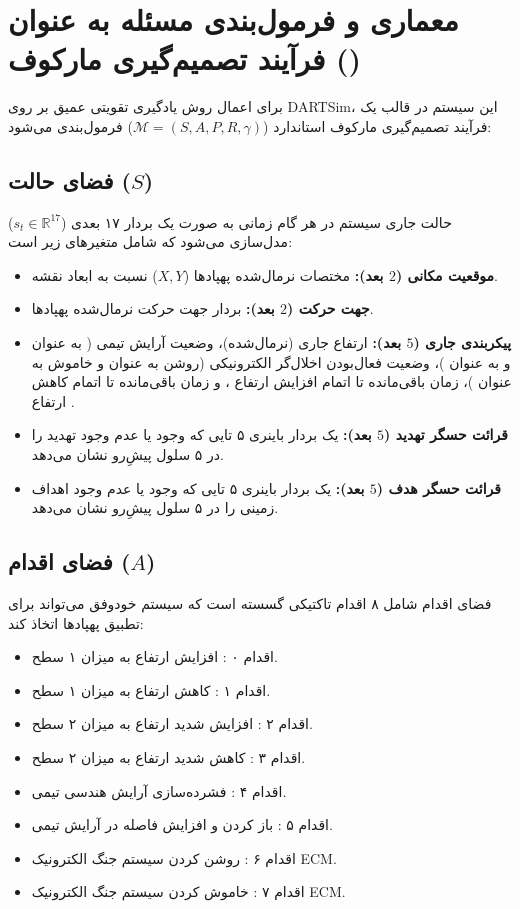 \documentclass[oneside,openany,a4paper,12pt]{article}
\begin{document}
\section{معماری و فرمول‌بندی مسئله به عنوان فرآیند تصمیم‌گیری مارکوف ()}
برای اعمال روش یادگیری تقویتی عمیق بر روی DARTSim، این سیستم در قالب یک فرآیند تصمیم‌گیری مارکوف استاندارد ($\mathcal{M} = (S, A, P, R, \gamma)$) فرمول‌بندی می‌شود:

\subsection{فضای حالت ($S$)}
حالت جاری سیستم در هر گام زمانی به صورت یک بردار ۱۷ بعدی ($s_t \in \mathbb{R}^{17}$) مدل‌سازی می‌شود که شامل متغیرهای زیر است:
\begin{itemize}
    \item \textbf{موقعیت مکانی ($2$ بعد):} مختصات نرمال‌شده پهپادها ($X, Y$) نسبت به ابعاد نقشه.
    \item \textbf{جهت حرکت ($2$ بعد):} بردار جهت حرکت نرمال‌شده پهپادها.
    \item \textbf{پیکربندی جاری ($5$ بعد):} ارتفاع جاری (نرمال‌شده)، وضعیت آرایش تیمی ( به عنوان  و  به عنوان )، وضعیت فعال‌بودن اخلال‌گر الکترونیکی  (روشن به عنوان  و خاموش به عنوان )، زمان باقی‌مانده تا اتمام افزایش ارتفاع ، و زمان باقی‌مانده تا اتمام کاهش ارتفاع .
    \item \textbf{قرائت حسگر تهدید ($5$ بعد):} یک بردار باینری ۵ تایی که وجود یا عدم وجود تهدید را در ۵ سلول پیشِ‌رو نشان می‌دهد.
    \item \textbf{قرائت حسگر هدف ($5$ بعد):} یک بردار باینری ۵ تایی که وجود یا عدم وجود اهداف زمینی را در ۵ سلول پیشِ‌رو نشان می‌دهد.
\end{itemize}

\subsection{فضای اقدام ($A$)}
فضای اقدام شامل ۸ اقدام تاکتیکی گسسته است که سیستم خودوفق می‌تواند برای تطبیق پهپادها اتخاذ کند:
\begin{itemize}
    \item اقدام ۰ : افزایش ارتفاع به میزان ۱ سطح.
    \item اقدام ۱ : کاهش ارتفاع به میزان ۱ سطح.
    \item اقدام ۲ : افزایش شدید ارتفاع به میزان ۲ سطح.
    \item اقدام ۳ : کاهش شدید ارتفاع به میزان ۲ سطح.
    \item اقدام ۴ : فشرده‌سازی آرایش هندسی تیمی.
    \item اقدام ۵ : باز کردن و افزایش فاصله در آرایش تیمی.
    \item اقدام ۶ : روشن کردن سیستم جنگ الکترونیک ECM.
    \item اقدام ۷ : خاموش کردن سیستم جنگ الکترونیک ECM.
\end{itemize}
\end{document}
